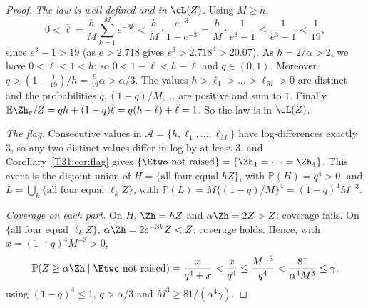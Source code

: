 \documentclass[11pt]{report}
\begin{document}
\begin{proof}
\emph{The law is well defined and in $\cL(Z)$.} Using $M\ge h$,
\[
0<\bar\ell=\frac hM\sum_{k=1}^Me^{-3k}<\frac hM\cdot\frac{e^{-3}}{1-e^{-3}}=\frac hM\cdot\frac1{e^3-1}\le\frac1{e^3-1}<\frac1{19},
\]
since $e^3-1>19$ (as $e>2.718$ gives $e^3>2.718^3>20.07$). As $h=2/\alpha>2$, we have $0<\bar\ell<1<h$; so $0<1-\bar\ell<h-\bar\ell$ and $q\in(0,1)$. Moreover
$q>(1-\tfrac1{19})/h=\tfrac{9}{19}\alpha>\alpha/3$. The values $h>\ell_1>\dots>\ell_M>0$ are distinct and the
probabilities $q,(1-q)/M,\dots$ are positive and sum to $1$. Finally
$\mathbb{E}\Zh_r/Z=qh+(1-q)\bar\ell=q(h-\bar\ell)+\bar\ell=1$. So the law is in $\cL(Z)$.

\emph{The flag.} Consecutive values in $\mathcal A=\{h,\ell_1,\dots,\ell_M\}$ have log-differences exactly $3$, so any two
distinct values differ in log by at least $3$, and Corollary~\ref{T31:cor:flag} gives
$\{\Etwo\text{ not raised}\}=\{\Zh_1=\dots=\Zh_4\}$. This event is the disjoint union of $H=\{\text{all four equal }hZ\}$,
with $\mathbb{P}(H)=q^4>0$, and $L=\bigcup_k\{\text{all four equal }\ell_kZ\}$, with
$\mathbb{P}(L)=M\{(1-q)/M\}^4=(1-q)^4M^{-3}$.

\emph{Coverage on each part.} On $H$, $\Zh=hZ$ and $\alpha\Zh=2Z>Z$: coverage fails. On $\{\text{all four equal }
\ell_kZ\}$, $\alpha\Zh=2e^{-3k}Z<Z$: coverage holds. Hence, with $x=(1-q)^4M^{-3}>0$,
\[
\mathbb{P}(Z\ge\alpha\Zh\mid\Etwo\text{ not raised})=\frac{x}{q^4+x}<\frac{x}{q^4}\le\frac{M^{-3}}{q^4}
<\frac{81}{\alpha^4M^3}\le\gamma,
\]
using $(1-q)^4\le1$, $q>\alpha/3$ and $M^3\ge81/(\alpha^4\gamma)$.
\end{proof}
\end{document}
